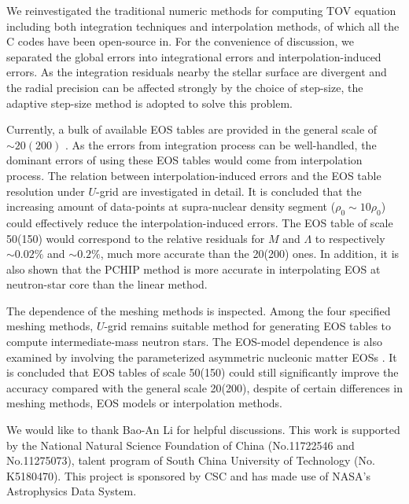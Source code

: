 \documentclass[preprint,tightenlines,eqsecnum,floats,aps,amsmath,amssymb,nofootinbib,prd,showpacs]{revtex4}
\begin{document}
We reinvestigated the traditional numeric methods for computing TOV equation including both integration techniques and interpolation methods, of which all the C codes have been open-source in. For the convenience of discussion, we separated the global errors into integrational errors and interpolation-induced errors. As the integration residuals nearby the stellar surface are divergent and the radial precision can be affected strongly by the choice of step-size, the adaptive step-size method is adopted to solve this problem.


Currently, a bulk of available EOS tables are provided in the general scale of $\sim20(200)$ . As the errors from integration process can be well-handled, the dominant errors of using these EOS tables would come from interpolation process. The relation between interpolation-induced errors and the EOS table resolution under $U$-grid are investigated in detail. It is concluded that the increasing amount of data-points at supra-nuclear density segment ($\rho_0 \sim 10 \rho_0$) could effectively reduce the interpolation-induced errors. The EOS table of scale 50(150) would correspond to the relative residuals for $M$ and $\Lambda$ to respectively $\sim0.02\%$ and $\sim0.2\%$, much more accurate than the 20(200) ones. In addition, it is also shown  that the PCHIP method is more accurate   in interpolating  EOS at neutron-star core than the linear method.

The dependence of the meshing methods is inspected. Among the four specified meshing methods, $U$-grid remains suitable method for generating EOS tables to compute intermediate-mass neutron stars. The EOS-model dependence is also examined by involving the parameterized asymmetric nucleonic matter EOSs . It is concluded that EOS tables of scale 50(150) could still significantly improve the accuracy compared with the general scale 20(200), despite of certain differences in meshing methods, EOS models or interpolation methods.

\begin{acknowledgements}
We would like to thank Bao-An Li for helpful discussions. This work is supported by the National Natural Science Foundation of China (No.11722546 and No.11275073), talent program of South China University of Technology (No. K5180470). This project is sponsored by CSC and has made use of NASA's Astrophysics Data System.

\end{acknowledgements}

\end{document}
